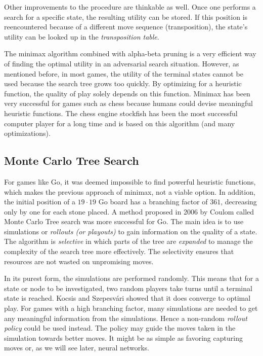 Other improvements to the procedure are thinkable as well. Once one performs a search for a specific state, the resulting utility can be stored. If this position is reencountered because of a different move sequence (transposition), the state's utility can be looked up in the \textit{transposition table}.

The minimax algorithm combined with alpha-beta pruning is a very efficient way of finding the optimal utility in an adversarial search situation. However, as mentioned before, in most games, the utility of the terminal states cannot be used because the search tree grows too quickly. By optimizing for a heuristic function, the quality of play solely depends on this function. Minimax has been very successful for games such as chess because humans could devise meaningful heuristic functions. The chess engine stockfish has been the most successful computer player for a long time and is based on this algorithm (and many optimizations). \cite{noauthor_stockfish_2021, noauthor_stockfish_nodate}

\subsection{Monte Carlo Tree Search}
For games like Go, it was deemed impossible to find powerful heuristic functions, which makes the previous approach of minimax, not a viable option. In addition, the initial position of a $19 \cdot 19$ Go board has a branching factor of $361$, decreasing only by one for each stone placed. A method proposed in 2006 by Coulom \cite{coulom_efficient_2007} called Monte Carlo Tree search was more successful for Go. The main idea is to use simulations or \textit{rollouts (or playouts)} to gain information on the quality of a state. The algorithm is \textit{selective} in which parts of the tree are \textit{expanded} to manage the complexity of the search tree more effectively. The selectivity ensures that resources are not wasted on unpromising moves.

In its purest form, the simulations are performed randomly. This means that for a state or node to be investigated, two random players take turns until a terminal state is reached. Kocsis and Szepesvári \cite{kocsis_bandit_2006} showed that it does converge to optimal play. For games with a high branching factor, many simulations are needed to get any meaningful information from the simulations. Hence a non-random \textit{rollout policy} could be used instead. The policy may guide the moves taken in the simulation towards better moves. It might be as simple as favoring capturing moves or, as we will see later, neural networks.

